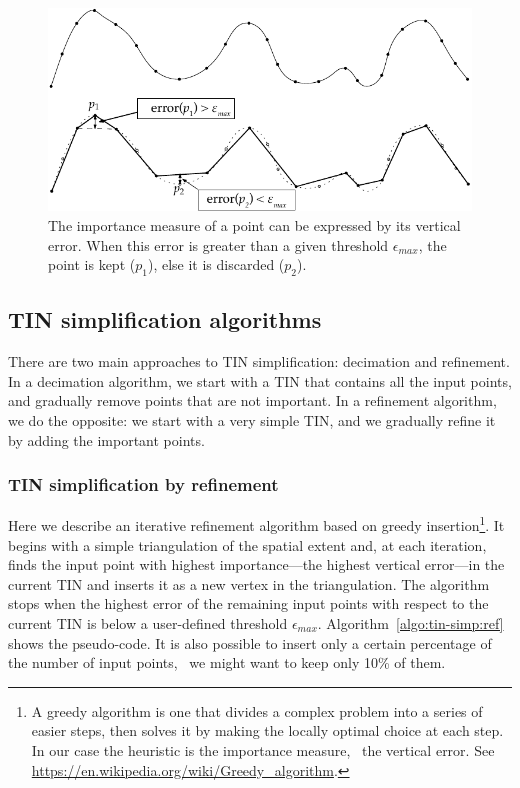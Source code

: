\begin{figure}
	\centering
	\includegraphics[width=0.85\linewidth]{figs/mesh_simplification}
	\caption{The importance measure of a point can be expressed by its vertical error. When this error is greater than a given threshold $\epsilon_{max}$, the point is kept ($p_1$), else it is discarded ($p_2$).}
	\label{fig:meshsimplification}
\end{figure}


\subsection{TIN simplification algorithms}

There are two main approaches to TIN simplification: decimation and refinement. 
In a decimation algorithm, we start with a TIN that contains all the input points, and gradually remove points that are not important. 
In a refinement algorithm, we do the opposite: we start with a very simple TIN, and we gradually refine it by adding the important points. 


\subsubsection{TIN simplification by refinement}
Here we describe an iterative refinement algorithm based on greedy insertion\footnote{A greedy algorithm is one that divides a complex problem into a series of easier steps, then solves it by making the locally optimal choice at each step.
In our case the heuristic is the importance measure, \ie\ the vertical error. See \url{https://en.wikipedia.org/wiki/Greedy_algorithm}.}. 
It begins with a simple triangulation of the spatial extent and, at each iteration, finds the input point with highest importance---the highest vertical error---in the current TIN and inserts it as a new vertex in the triangulation. 
The algorithm stops when the highest error of the remaining input points with respect to the current TIN is below a user-defined threshold $\epsilon_{max}$. Algorithm~\ref{algo:tin-simp:ref} shows the pseudo-code.
It is also possible to insert only a certain percentage of the number of input points, \eg\ we might want to keep only 10\% of them.

